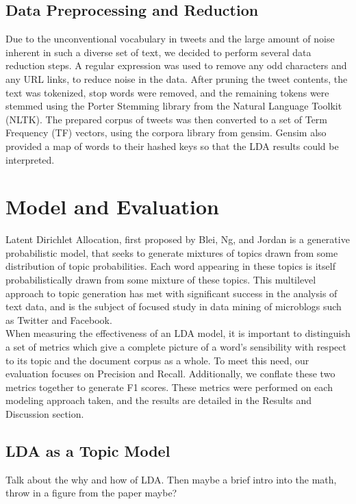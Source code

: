 \documentclass{acm_proc_article-sp}
\begin{document}
\subsection{Data Preprocessing and Reduction}
\hspace*{5mm}Due to the unconventional vocabulary in tweets and the large amount of noise inherent in such a diverse set of text, we decided to perform several data reduction steps. A regular expression was used to remove any odd characters and any URL links, to reduce noise in the data. After pruning the tweet contents, the text was tokenized, stop words were removed, and the remaining tokens were stemmed using the Porter Stemming library from the Natural Language Toolkit (NLTK). The prepared corpus of tweets was then converted to a set of Term Frequency (TF) vectors, using the corpora library from gensim. Gensim also provided a map of words to their hashed keys so that the LDA results could be interpreted.

\section{Model and Evaluation}
\hspace*{5mm}Latent Dirichlet Allocation, first proposed by Blei, Ng, and Jordan \cite{blei2003latent} is a generative probabilistic model, that seeks to generate mixtures of topics drawn from some distribution of topic probabilities. Each word appearing in these topics is itself probabilistically drawn from some mixture of these topics. This multilevel approach to topic generation has met with significant success in the analysis of text data, and is the subject of focused study in data mining of microblogs such as Twitter and Facebook.\\
\hspace*{5mm}When measuring the effectiveness of an LDA model, it is important to distinguish a set of metrics which give a complete picture of a word's sensibility with respect to its topic and the document corpus as a whole. To meet this need, our evaluation focuses on Precision and Recall. Additionally, we conflate these two metrics together to generate F1 scores. These metrics were performed on each modeling approach taken, and the results are detailed in the Results and Discussion section.
\subsection{LDA as a Topic Model}
\hspace*{5mm}Talk about the why and how of LDA. Then maybe a brief intro into the math, throw in a figure from the paper maybe?
\end{document}
